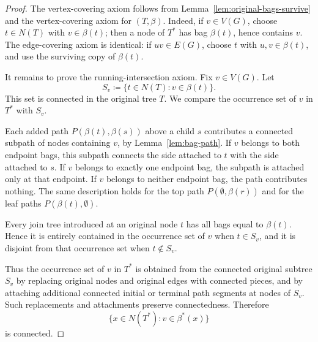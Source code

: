 \documentclass[11pt]{article}
\theoremstyle{definition}
\newcommand{\defeq}{\coloneqq}
\newcommand{\Nodes}{N}
\begin{document}
\begin{proof}
The vertex-covering axiom follows from Lemma~\ref{lem:original-bags-survive}
and the vertex-covering axiom for \((T,\beta)\).  Indeed, if \(v\in V(G)\),
choose \(t\in\Nodes(T)\) with \(v\in\beta(t)\); then a node of \(T^\ast\) has
bag \(\beta(t)\), hence contains \(v\).  The edge-covering axiom is identical:
if \(uv\in E(G)\), choose \(t\) with \(u,v\in\beta(t)\), and use the surviving
copy of \(\beta(t)\).

It remains to prove the running-intersection axiom.  Fix \(v\in V(G)\).  Let
\[
  S_v\defeq\{t\in\Nodes(T):v\in\beta(t)\}.
\]
This set is connected in the original tree \(T\).  We compare the occurrence
set of \(v\) in \(T^\ast\) with \(S_v\).

Each added path \(P(\beta(t),\beta(s))\) above a child \(s\) contributes a
connected subpath of nodes containing \(v\), by Lemma~\ref{lem:bag-path}.  If
\(v\) belongs to both endpoint bags, this subpath connects the side attached to
\(t\) with the side attached to \(s\).  If \(v\) belongs to exactly one endpoint
bag, the subpath is attached only at that endpoint.  If \(v\) belongs to
neither endpoint bag, the path contributes nothing.  The same description holds
for the top path \(P(\emptyset,\beta(r))\) and for the leaf paths
\(P(\beta(t),\emptyset)\).

Every join tree introduced at an original node \(t\) has all bags equal to
\(\beta(t)\).  Hence it is entirely contained in the occurrence set of \(v\)
when \(t\in S_v\), and it is disjoint from that occurrence set when
\(t\notin S_v\).

Thus the occurrence set of \(v\) in \(T^\ast\) is obtained from the connected
original subtree \(S_v\) by replacing original nodes and original edges with
connected pieces, and by attaching additional connected initial or terminal
path segments at nodes of \(S_v\).  Such replacements and attachments preserve
connectedness.  Therefore
\[
  \{x\in\Nodes(T^\ast):v\in\beta^\ast(x)\}
\]
is connected.
\end{proof}
\end{document}
